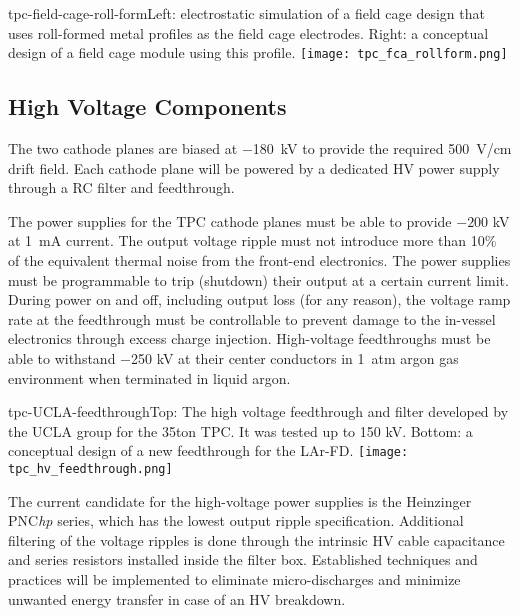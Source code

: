 \begin{cdrfigure}{tpc-field-cage-roll-form}{Left: electrostatic simulation of a field cage design that uses roll-formed metal profiles as the field cage electrodes.  Right: a conceptual design of a field cage module using this profile.}
\texttt{[image: tpc\_fca\_rollform.png]}
\end{cdrfigure}


\subsection{High Voltage Components}  
\label{subsec:fd-ref-hv}
   
The two cathode planes are biased at $-$180~kV to provide the required 
500~V/cm drift field. Each cathode plane will be powered by a dedicated HV power supply through a RC filter and feedthrough.

The power supplies for the TPC cathode planes must be able to provide $-200$ kV at 1~mA current. The output voltage ripple 
must not introduce more than 10\% of the equivalent thermal noise from the front-end electronics. 
The power supplies must be programmable to trip (shutdown) their output at a certain current limit.  During power on and off, 
including output loss (for any reason), the voltage ramp rate at the feedthrough must be controllable to prevent 
damage to the in-vessel electronics through excess charge injection.  High-voltage feedthroughs must be able to withstand $-$250 kV 
at their center conductors in 1~atm argon gas environment when terminated in liquid argon.

\begin{cdrfigure}{tpc-UCLA-feedthrough}{Top: The high voltage feedthrough and filter developed by the UCLA 
group for the 35ton TPC.  It was tested up to 150 kV.  Bottom: a conceptual design of a new feedthrough for the LAr-FD.}
\texttt{[image: tpc\_hv\_feedthrough.png]}
\end{cdrfigure}

The current candidate for the high-voltage power supplies is 
the Heinzinger PNC{\it hp} series, which has the lowest output ripple specification.  Additional filtering of the voltage ripples is done through the intrinsic HV cable capacitance and series resistors installed inside the filter box. Established techniques and practices will be implemented to eliminate micro-discharges and minimize unwanted energy transfer in case of an HV breakdown. 
  
